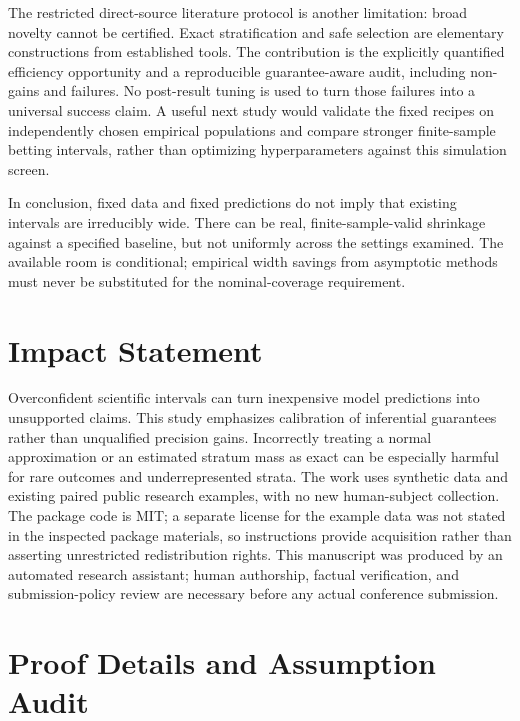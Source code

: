 \documentclass{article}
\begin{document}
The restricted direct-source literature protocol is another limitation: broad novelty cannot be certified. Exact stratification and safe selection are elementary constructions from established tools. The contribution is the explicitly quantified efficiency opportunity and a reproducible guarantee-aware audit, including non-gains and failures. No post-result tuning is used to turn those failures into a universal success claim. A useful next study would validate the fixed recipes on independently chosen empirical populations and compare stronger finite-sample betting intervals, rather than optimizing hyperparameters against this simulation screen.

In conclusion, fixed data and fixed predictions do not imply that existing intervals are irreducibly wide. There can be real, finite-sample-valid shrinkage against a specified baseline, but not uniformly across the settings examined. The available room is conditional; empirical width savings from asymptotic methods must never be substituted for the nominal-coverage requirement.

\section*{Impact Statement}
Overconfident scientific intervals can turn inexpensive model predictions into unsupported claims. This study emphasizes calibration of inferential guarantees rather than unqualified precision gains. Incorrectly treating a normal approximation or an estimated stratum mass as exact can be especially harmful for rare outcomes and underrepresented strata. The work uses synthetic data and existing paired public research examples, with no new human-subject collection. The package code is MIT; a separate license for the example data was not stated in the inspected package materials, so instructions provide acquisition rather than asserting unrestricted redistribution rights. This manuscript was produced by an automated research assistant; human authorship, factual verification, and submission-policy review are necessary before any actual conference submission.




\newpage
\appendix
\onecolumn
\section{Proof Details and Assumption Audit}\label{app:proofs}
\end{document}

